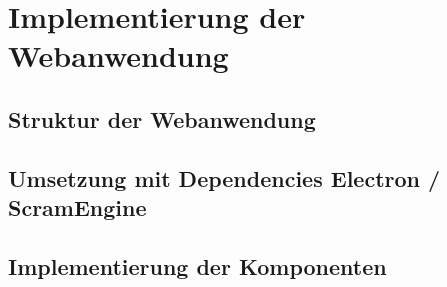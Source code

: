 \chapter{Implementierung der Webanwendung}

\section{Struktur der Webanwendung}

\section{Umsetzung mit Dependencies Electron / ScramEngine}

\section{Implementierung der Komponenten}
